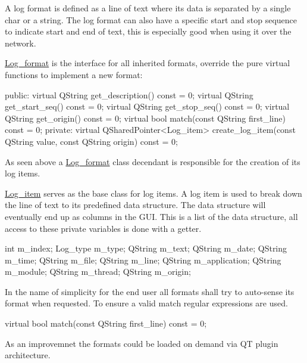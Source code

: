 A log format is defined as a line of text where its data is separated by a single char or a string. The log format can also have a specific start and stop sequence to indicate start and end of text, this is especially good when using it over the network.

\hyperlink{class_log__viewer_1_1_log__format}{Log\-\_\-format} is the interface for all inherited formats, override the pure virtual functions to implement a new format\-: 
\begin{DoxyCode}
\textcolor{keyword}{public}:
    \textcolor{keyword}{virtual} QString get\_description() \textcolor{keyword}{const} = 0;
    \textcolor{keyword}{virtual} QString get\_start\_seq() \textcolor{keyword}{const} = 0;
    \textcolor{keyword}{virtual} QString get\_stop\_seq() \textcolor{keyword}{const} = 0;
    \textcolor{keyword}{virtual} QString get\_origin() \textcolor{keyword}{const} = 0;
    \textcolor{keyword}{virtual} \textcolor{keywordtype}{bool} match(\textcolor{keyword}{const} QString first\_line) \textcolor{keyword}{const} = 0;
\textcolor{keyword}{private}:
    \textcolor{keyword}{virtual} QSharedPointer<Log\_item> create\_log\_item(\textcolor{keyword}{const} QString value, \textcolor{keyword}{const} QString origin) \textcolor{keyword}{const} = 0;
\end{DoxyCode}


As seen above a \hyperlink{class_log__viewer_1_1_log__format}{Log\-\_\-format} class decendant is responsible for the creation of its log items.

\hyperlink{class_log__viewer_1_1_log__item}{Log\-\_\-item} serves as the base class for log items. A log item is used to break down the line of text to its predefined data structure. The data structure will eventually end up as columns in the G\-U\-I. This is a list of the data structure, all access to these private variables is done with a getter. 
\begin{DoxyCode}
\textcolor{keywordtype}{int} m\_index;
Log\_type m\_type;
QString m\_text;
QString m\_date;
QString m\_time;
QString m\_file;
QString m\_line;
QString m\_application;
QString m\_module;
QString m\_thread;
QString m\_origin;
\end{DoxyCode}


In the name of simplicity for the end user all formats shall try to auto-\/sense its format when requested. To ensure a valid match regular expressions are used. 
\begin{DoxyCode}
\textcolor{keyword}{virtual} \textcolor{keywordtype}{bool} match(\textcolor{keyword}{const} QString first\_line) \textcolor{keyword}{const} = 0;
\end{DoxyCode}
 As an improvemnet the formats could be loaded on demand via Q\-T plugin architecture.


